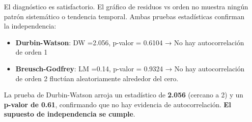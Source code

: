\documentclass[
  letterpaper,
  DIV=11,
  numbers=noendperiod]{scrreprt}
\providecommand{\tightlist}{%
  \setlength{\itemsep}{0pt}\setlength{\parskip}{0pt}}
\begin{document}
\begin{tcolorbox}
El diagnóstico es satisfactorio. El gráfico de residuos vs orden no
muestra ningún patrón sistemático o tendencia temporal. Ambas pruebas
estadísticas confirman la independencia:

\begin{itemize}
\tightlist
\item
  \textbf{Durbin-Watson}: DW =2.056, p-valor = 0.6104 → No hay
  autocorrelación de orden 1
\item
  \textbf{Breusch-Godfrey}: LM =0.14, p-valor = 0.9324 → No hay
  autocorrelación de orden 2 fluctúan aleatoriamente alrededor del cero.
\end{itemize}

La prueba de Durbin-Watson arroja un estadístico de \textbf{2.056}
(cercano a 2) y un \textbf{p-valor de 0.61}, confirmando que no hay
evidencia de autocorrelación. \textbf{El supuesto de independencia se
cumple}.

\end{tcolorbox}
\end{document}
